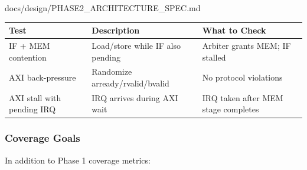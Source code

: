 \begin{relocated}{docs/design/PHASE2_ARCHITECTURE_SPEC.md}
{
\begin{longtable}[]{@{}
  >{\raggedright\arraybackslash}p{}
  >{\raggedright\arraybackslash}p{}
  >{\raggedright\arraybackslash}p{}@{}}
\toprule\noalign{}
\begin{minipage}[b]{\linewidth}\raggedright
Test
\end{minipage} & \begin{minipage}[b]{\linewidth}\raggedright
Description
\end{minipage} & \begin{minipage}[b]{\linewidth}\raggedright
What to Check
\end{minipage} \\
\midrule\noalign{}
\endhead
\bottomrule\noalign{}
\endlastfoot
IF + MEM contention & Load/\allowbreak{}store while IF also pending &
Arbiter grants MEM; IF stalled \\
AXI back-pressure & Randomize
arready/\allowbreak{}rvalid/\allowbreak{}bvalid & No protocol
violations \\
AXI stall with pending IRQ & IRQ arrives during AXI wait & IRQ taken
after MEM stage completes \\
\end{longtable}
}

\subsubsection{Coverage Goals}\label{ds:ch:phase2-architecture:73-coverage-goals}

In addition to Phase 1 coverage metrics:


\end{relocated}
